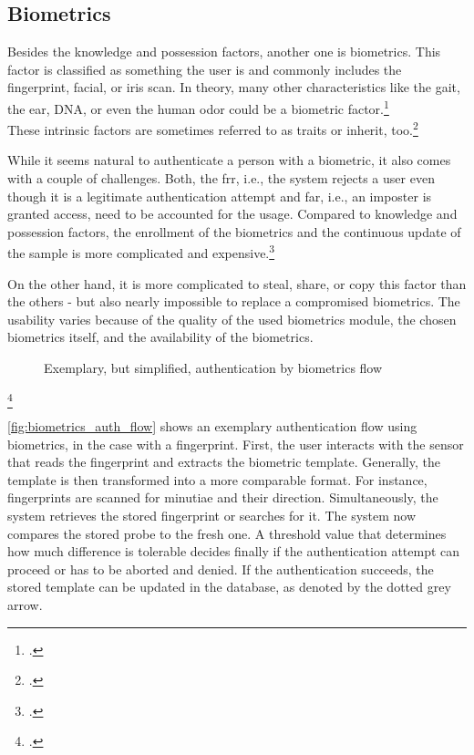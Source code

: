 \subsection{Biometrics}

Besides the knowledge and possession factors, another one is biometrics. This factor is classified as \frqq something the user is\flqq{} and commonly includes the fingerprint, facial, or iris scan. In theory, many other characteristics like the gait, the ear, DNA, or even the human odor could be a biometric factor.\footcite[See][30--34]{Jain2011}\\
These intrinsic factors are sometimes referred to as traits or inherit, too.\footcite[See][186]{dasgupta2017multi}

While it seems natural to authenticate a person with a biometric, it also comes with a couple of challenges. Both, the \gls{frr}, i.e., the system rejects a user even though it is a legitimate authentication attempt and \gls{far}, i.e., an imposter is granted access, need to be accounted for the usage. Compared to knowledge and possession factors, the enrollment of the biometrics and the continuous update of the sample is more complicated and expensive.\footcites[See][18--24]{Jain2011}[See][34--37]{265831}

On the other hand, it is more complicated to steal, share, or copy this factor than the others - but also nearly impossible to replace a compromised biometrics. The usability varies because of the quality of the used biometrics module, the chosen biometrics itself, and the availability of the biometrics.

\begin{figure}[hbt]
	\centering
	
	\caption[Exemplary, but simplified, authentication by biometrics flow]{Exemplary, but simplified, authentication by biometrics flow\footnotemark}
	\label{fig:biometrics_auth_flow}
\end{figure}
\footcitetext[Source: diagram by author, based on][11]{Jain2011}


\autoref{fig:biometrics_auth_flow} shows an exemplary authentication flow using biometrics, in the case with a fingerprint. First, the user interacts with the sensor that reads the fingerprint and extracts the biometric template. Generally, the template is then transformed into a more comparable format. For instance, fingerprints are scanned for minutiae and their direction. Simultaneously, the system retrieves the stored fingerprint or searches for it. The system now compares the stored probe to the fresh one. A threshold value that determines how much difference is tolerable decides finally if the authentication attempt can proceed or has to be aborted and denied. If the authentication succeeds, the stored template can be updated in the database, as denoted by the dotted grey arrow.

